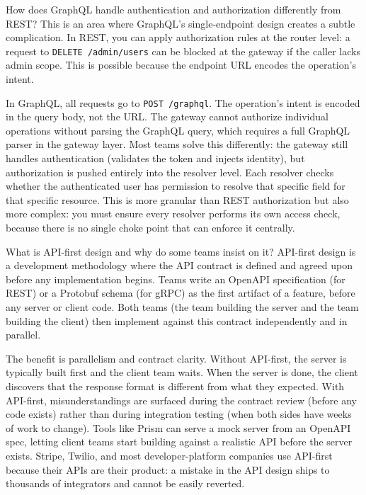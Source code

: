 \documentclass[11pt,a4paper]{article}
\begin{document}
\begin{curiobox}{How does GraphQL handle authentication and authorization differently from REST?}
This is an area where GraphQL's single-endpoint design creates a subtle complication. In REST, you can apply authorization rules at the router level: a request to \texttt{DELETE /admin/users} can be blocked at the gateway if the caller lacks admin scope. This is possible because the endpoint URL encodes the operation's intent.

In GraphQL, all requests go to \texttt{POST /graphql}. The operation's intent is encoded in the query body, not the URL. The gateway cannot authorize individual operations without parsing the GraphQL query, which requires a full GraphQL parser in the gateway layer. Most teams solve this differently: the gateway still handles authentication (validates the token and injects identity), but authorization is pushed entirely into the resolver level. Each resolver checks whether the authenticated user has permission to resolve that specific field for that specific resource. This is more granular than REST authorization but also more complex: you must ensure every resolver performs its own access check, because there is no single choke point that can enforce it centrally.
\end{curiobox}

\begin{curiobox}{What is API-first design and why do some teams insist on it?}
API-first design is a development methodology where the API contract is defined and agreed upon before any implementation begins. Teams write an OpenAPI specification (for REST) or a Protobuf schema (for gRPC) as the first artifact of a feature, before any server or client code. Both teams (the team building the server and the team building the client) then implement against this contract independently and in parallel.

The benefit is parallelism and contract clarity. Without API-first, the server is typically built first and the client team waits. When the server is done, the client discovers that the response format is different from what they expected. With API-first, misunderstandings are surfaced during the contract review (before any code exists) rather than during integration testing (when both sides have weeks of work to change). Tools like Prism can serve a mock server from an OpenAPI spec, letting client teams start building against a realistic API before the server exists. Stripe, Twilio, and most developer-platform companies use API-first because their APIs are their product: a mistake in the API design ships to thousands of integrators and cannot be easily reverted.
\end{curiobox}
\end{document}
